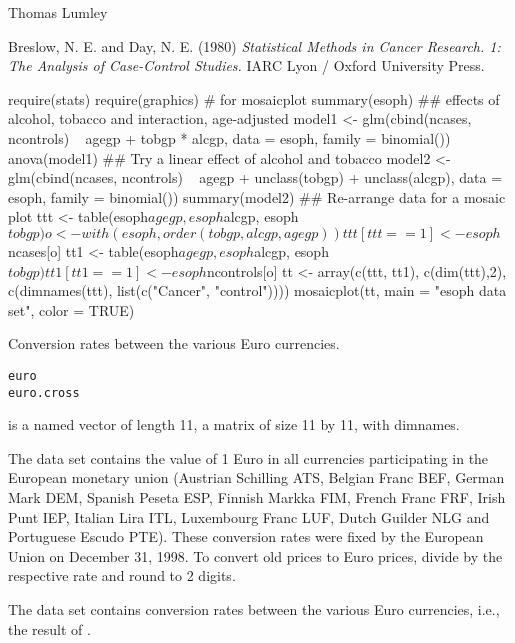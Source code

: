 %
\begin{Author}\relax
Thomas Lumley
\end{Author}
%
\begin{Source}\relax
Breslow, N. E. and Day, N. E. (1980)
\emph{Statistical Methods in Cancer Research. 1: The Analysis of
Case-Control Studies.}  IARC Lyon / Oxford University Press.
\end{Source}
%
\begin{Examples}
\begin{ExampleCode}
require(stats)
require(graphics) # for mosaicplot
summary(esoph)
## effects of alcohol, tobacco and interaction, age-adjusted
model1 <- glm(cbind(ncases, ncontrols) ~ agegp + tobgp * alcgp,
              data = esoph, family = binomial())
anova(model1)
## Try a linear effect of alcohol and tobacco
model2 <- glm(cbind(ncases, ncontrols) ~ agegp + unclass(tobgp)
                                         + unclass(alcgp),
              data = esoph, family = binomial())
summary(model2)
## Re-arrange data for a mosaic plot
ttt <- table(esoph$agegp, esoph$alcgp, esoph$tobgp)
o <- with(esoph, order(tobgp, alcgp, agegp))
ttt[ttt == 1] <- esoph$ncases[o]
tt1 <- table(esoph$agegp, esoph$alcgp, esoph$tobgp)
tt1[tt1 == 1] <- esoph$ncontrols[o]
tt <- array(c(ttt, tt1), c(dim(ttt),2),
            c(dimnames(ttt), list(c("Cancer", "control"))))
mosaicplot(tt, main = "esoph data set", color = TRUE)
\end{ExampleCode}
\end{Examples}
%
\begin{Description}\relax
Conversion rates between the various Euro currencies.
\end{Description}
%
\begin{Usage}
\begin{verbatim}
euro
euro.cross
\end{verbatim}
\end{Usage}
%
\begin{Format}
 is a named vector of length 11,  a 
matrix of size 11 by 11, with dimnames.
\end{Format}
%
\begin{Details}\relax
The data set  contains the value of 1 Euro in all
currencies participating in the European monetary union (Austrian
Schilling ATS, Belgian Franc BEF, German Mark DEM, Spanish Peseta ESP,
Finnish Markka FIM, French Franc FRF, Irish Punt IEP, Italian Lira
ITL, Luxembourg Franc LUF, Dutch Guilder NLG and Portuguese Escudo
PTE).  These conversion rates were fixed by the European Union on
December 31, 1998.  To convert old prices to Euro prices, divide by
the respective rate and round to 2 digits.

The data set  contains conversion rates between the
various Euro currencies, i.e., the result of
.
\end{Details}
